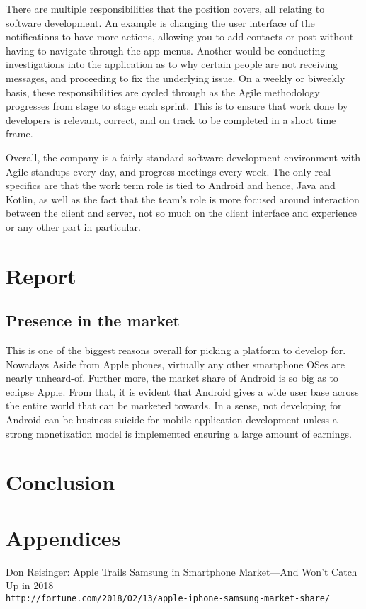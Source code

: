 \documentclass[12pt, letterpaper]{article}
\begin{document}
There are multiple responsibilities that the position covers, all relating
to software development. An example is changing the user interface of the 
notifications to have more actions, allowing you to add contacts or post 
without having to navigate through the app menus. Another would be 
conducting investigations into the application as to why certain people 
are not receiving messages, and proceeding to fix the underlying issue.
On a weekly or biweekly basis, these responsibilities are cycled through
as the Agile methodology progresses from stage to stage each sprint.
This is to ensure that work done by developers is relevant, correct, and on
track to be completed in a short time frame.

Overall, the company is a fairly standard software development environment
with Agile standups every day, and progress meetings every week. The only 
real specifics are that the work term role is tied to Android and hence, 
Java and Kotlin, as well as the fact that the team's role is more focused 
around interaction between the client and server, not so much on the client
interface and experience or any other part in particular.

\section{Report}

\subsection{Presence in the market}
This is one of the biggest reasons overall for picking a platform to
develop for. Nowadays Aside from Apple phones, virtually any other
smartphone OSes are nearly unheard-of. Further more, the market share of
Android is so big as to eclipse Apple\cite{marketshare}. From that, it
is evident that Android gives a wide user base across the entire world
that can be marketed towards. In a sense, not developing for Android can
be business suicide for mobile application development unless a strong
monetization model is implemented ensuring a large amount of earnings.


\section{Conclusion}

\section{Appendices}

\begin{thebibliography}{9}
Don Reisinger: Apple Trails Samsung in Smartphone Market—And Won't Catch Up in 2018
\\\texttt{http://fortune.com/2018/02/13/apple-iphone-samsung-market-share/}
\end{thebibliography}
\end{document}
